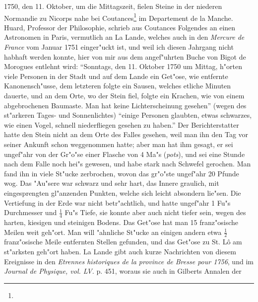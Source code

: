 \documentclass[a4paper, 11pt, oneside, polutonikogreek, german]{article}
\begin{document}
1750, den 11. Oktober, um die Mittagszeit, fielen Steine in der niederen Normandie zu Nicorps nahe bei Coutances\footnote{} im Departement de la Manche. Huard, Professor der Philosophie, schrieb aus Coutances Folgendes an einen Astronomen in Paris, vermutlich an La Lande, welches auch in den \emph{Mercure de France} vom Januar 1751 einger"uckt ist, und weil ich diesen Jahrgang nicht habhaft werden konnte, hier von mir aus dem angef"uhrten Buche von Bigot de Morogues entlehnt wird: "`Sonntags, den 11. Oktober 1750 um Mittag, h"orten viele Personen in der Stadt und auf dem Lande ein Get"ose, wie entfernte Kanonensch"usse, dem letzteren folgte ein Sausen, welches etliche Minuten dauerte, und an dem Orte, wo der Stein fiel, folgte ein Krachen, wie von einem abgebrochenen Baumaste. Man hat keine Lichterscheinung gesehen"' (wegen des st"arkeren Tages- und Sonnenlichtes) "`einige Personen glaubten, etwas schwarzes, wie einen Vogel, schnell niederfliegen gesehen zu haben."' Der Berichterstatter hatte den Stein nicht an dem Orte des Falles gesehen, weil man ihn den Tag vor seiner Ankunft schon weggenommen hatte; aber man hat ihm gesagt, er sei ungef"ahr von der Gr"o"se einer Flasche von 4 Ma"s (\emph{pots}), und sei eine Stunde nach dem Falle noch hei"s gewesen, und habe stark nach Schwefel gerochen. Man fand ihn in viele St"ucke zerbrochen, wovon das gr"o"ste ungef"ahr 20 Pfunde wog. Das "Au"sere war schwarz und sehr hart, das Innere graulich, mit eingesprengten gl"anzenden Punkten, welche sich leicht absondern lie"sen. Die Vertiefung in der Erde war nicht betr"achtlich, und hatte ungef"ahr 1 Fu"s Durchmesser und $\mathfrak{\frac{1}{4}}$ Fu"s Tiefe, sie konnte aber auch nicht tiefer sein, wegen des harten, kiesigen und steinigen Bodens. Das Get"ose hat man 15 franz"osische Meilen weit geh"ort. Man will "ahnliche St"ucke an einigen andern etwa $\mathfrak{\frac{1}{2}}$ franz"osische Meile entfernten Stellen gefunden, und das Get"ose zu St. Lô am st"arksten geh"ort haben. La Lande gibt auch kurze Nachrichten von diesem Ereignisse in den \emph{Etrennes historiques de la province de Bresse pour 1756}, und im \emph{Journal de Physique, vol. LV.} p. 451, woraus sie auch in Gilberts Annalen der 
\end{document}

